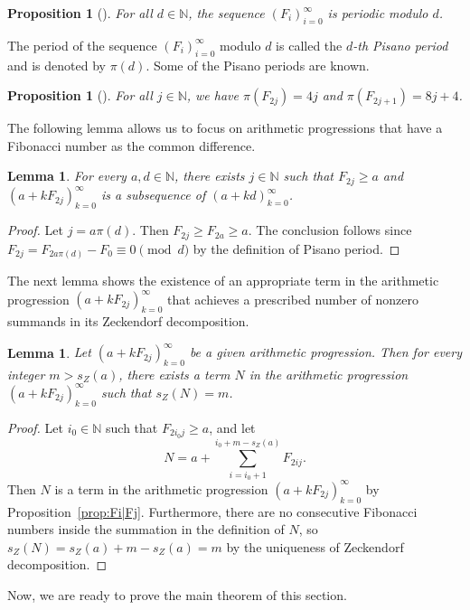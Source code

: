 \documentclass[12pt]{article}
\newtheorem{lemma}[theorem]{Lemma}
\newtheorem{proposition}[theorem]{Proposition}
\theoremstyle{definition}
\newcommand{\N}{\mathbb{N}}
\begin{document}
\begin{proposition}[\cite{wall}]\label{prop:Fiperiodic}
For all $d\in\N$, the sequence $(F_i)_{i=0}^\infty$ is periodic modulo $d$.
\end{proposition}

The period of the sequence $(F_i)_{i=0}^\infty$ modulo $d$ is called the \emph{$d$-th Pisano period} and is denoted by $\pi(d)$. Some of the Pisano periods are known.

\begin{proposition}[\cite{ehrlich}]\label{prop:Pisano}
For all $j\in\N$, we have $\pi(F_{2j})=4j$ and $\pi(F_{2j+1})=8j+4$.
\end{proposition}

The following lemma allows us to focus on arithmetic progressions that have a Fibonacci number as the common difference.

\begin{lemma}\label{lem:d=F2jsubseq}
For every $a,d\in\N$, there exists $j\in\N$ such that $F_{2j}\geq a$ and $(a+kF_{2j})_{k=0}^\infty$ is a subsequence of $(a+kd)_{k=0}^\infty$.
\end{lemma}
\begin{proof}
Let $j=a\pi(d)$. Then $F_{2j}\geq F_{2a}\geq a$. The conclusion follows since $F_{2j}=F_{2a\pi(d)}-F_0\equiv0\pmod{d}$ by the definition of Pisano period.
\end{proof}

The next lemma shows the existence of an appropriate term in the arithmetic progression $(a+kF_{2j})_{k=0}^\infty$ that achieves a prescribed number of nonzero summands in its Zeckendorf decomposition.

\begin{lemma}\label{lem:prescribedsZ}
Let $(a+kF_{2j})_{k=0}^\infty$ be a given arithmetic progression. Then for every integer $m>s_Z(a)$, there exists a term $N$ in the arithmetic progression $(a+kF_{2j})_{k=0}^\infty$ such that $s_Z(N)=m$.
\end{lemma}
\begin{proof}
Let $i_0\in\N$ such that $F_{2i_0j}\geq a$, and let
\[N=a+\sum_{i=i_0+1}^{i_0+m-s_Z(a)}F_{2ij}.\]
Then $N$ is a term in the arithmetic progression $(a+kF_{2j})_{k=0}^\infty$ by Proposition~\ref{prop:Fi|Fj}. Furthermore, there are no consecutive Fibonacci numbers inside the summation in the definition of $N$, so $s_Z(N)=s_Z(a)+m-s_Z(a)=m$ by the uniqueness of Zeckendorf decomposition.
\end{proof}

Now, we are ready to prove the main theorem of this section.
\end{document}
